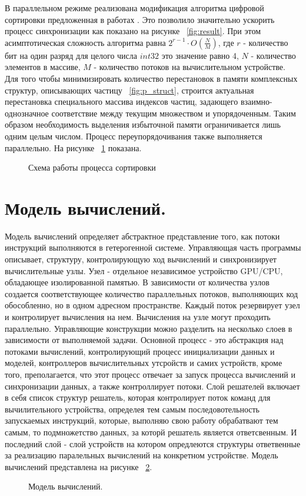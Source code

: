 В параллельном режиме реализована модификация алгоритма цифровой сортировки предложенная в работах \cite{Knuth1998, Marcho1991}. Это позволило значительно ускорить процесс синхронизации как показано на рисунке ~\ref{fig:result}. При этом асимптотическая сложность алгоритма равна \( 2^{r-1} \cdot O(\frac{N}{M}) \), где \( r \) - количество бит на один разряд для целого числа \( int32 \) это значение равно 4, \( N \) - количество элементов в массиве, \( M \) - количество потоков на вычислительном устройстве. Для того чтобы минимизировать количество перестановок в памяти комплексных структур, описывающих частицу ~\ref{fig:p_struct}, строится актуальная перестановка специального массива  индексов частиц, задающего взаимно-однозначное соответствие между текущим множеством и упорядоченным. Таким образом необходимость выделения избыточной памяти ограничивается лишь одним целым числом.
Процесс переупорядочивания также выполняется параллельно. На рисунке ~\ref{fig:sort1} показана.
\begin{figure}[ht]
  \caption{Схема работы процесса сортировки}\label{fig:sort1}
\end{figure}

\section{Модель вычислений.}\label{sec:ch3/sect3}

Модель вычислений определяет абстрактное представление того, как потоки инструкций выполняются в гетерогенной системе. Управляющая часть программы описывает, структуру, контролирующую ход вычислений и синхронизирует вычислительные узлы. Узел - отдельное независимое устройство GPU/CPU, обладающее изолированной памятью. В зависимости от количества узлов создается соответствующее количество параллельных потоков, выполняющих код обособленно, но в одном адресном пространстве. Каждый поток резервирует узел и контролирует вычисления на нем. Вычисления на узле могут проходить параллельно. Управляющие конструкции можно разделить на несколько слоев в зависимости от выполняемой задачи. Основной процесс - это абстракция над потоками вычислений, контролирующий процесс инициализации данных и моделей, контроллеров вычислительных утсройств и самих устройств, кроме того, преполагается, что этот процесс отвечает за запуск процесса вычислений и синхронизации данных, а также контроллирует потоки. Слой решателей включает в себя список структур решатель, которая контролирует поток команд для вычилительного устройства, определея тем самым последовотельность запускаемых инструкций, которые, выполняю свою работу обрабатвают тем самым, то подмножетство данных, за которй решатель является ответсвенным. И последний слой - слой устройств на котором опредлеются структуры ответвенные за реализацию паралельных вычислений на конкретном устройстве.
Модель вычислений представлена на рисунке ~\ref{fig:calc1}.
\begin{figure}[ht]
  \caption{Модель вычислений.}\label{fig:calc1}
\end{figure}

